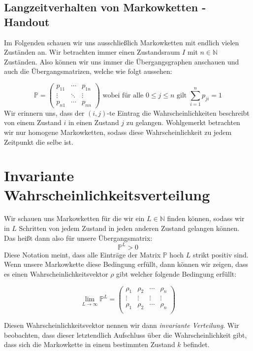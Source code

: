 \documentclass[a4paper]{article}
\begin{document}
\begin{center}
	\section*{Langzeitverhalten von Markowketten - Handout}
\end{center}

Im Folgenden schauen wir uns ausschließlich Markowketten mit endlich vielen Zuständen an.
Wir betrachten immer einen Zustandsraum $I$ mit $n \in \mathbb{N}$ Zuständen.
Also können wir uns immer die Übergangsgraphen anschauen und auch die Übergangsmatrizen,
welche wie folgt aussehen:

\[
\mathbb{P} = \begin{pmatrix} 
	p_{11} & \cdots & p_{1n} \\
	\vdots & \ddots & \vdots \\
	p_{n1} & \cdots & p_{nn}
\end{pmatrix} 
\text{ wobei für alle $0 \leq j \leq n$ gilt }
\sum_{i=1}^{n} p_{ji} = 1
\]
Wir erinnern uns, dass der $(i,j)$-te Eintrag die Wahrscheinlichkeiten beschreibt von einem Zustand $i$ in einen
Zustand $j$ zu gelangen. Wohlgemerkt betrachten wir nur homogene Markowketten, sodass diese Wahrscheinlichkeit
zu jedem Zeitpunkt die selbe ist.
\\

\section{Invariante Wahrscheinlichkeitsverteilung}
Wir schauen uns Markowketten für die wir ein $L \in \mathbb{N}$ finden können, sodass
wir in $L$ Schritten von jedem Zustand in jeden anderen Zustand gelangen können.
Das heißt dann also für unsere Übergangsmatrix:
\[
\mathbb{P} ^{L} > 0
\] 
Diese Notation meint, dass alle Einträge der Matrix $\mathbb{P}$ hoch $L$ strikt positiv sind.
Wenn unsere Markowkette diese Bedingung erfüllt, dann können wir zeigen, dass es einen
Wahrscheinlichkeitsvektor $\rho$ gibt welcher folgende Bedingung erfüllt:

\[
	\lim_{L \to \infty} \mathbb{P} ^{L} =
	\begin{pmatrix} 
		\rho_1 & \rho_2 & \cdots & \rho_n \\
		\vdots & \vdots & \vdots & \vdots \\
		\rho_1 & \rho_2 & \cdots & \rho_n \\
	\end{pmatrix} 
\]

Diesen Wahrscheinlichkeitsvektor nennen wir dann \textit{invariante Verteilung}.
Wir beobachten, dass dieser letztendlich Aufschluss über die Wahrscheinlichkeit gibt, dass sich die
Markowkette in einem bestimmten Zustand $k$ befindet.
\end{document}
